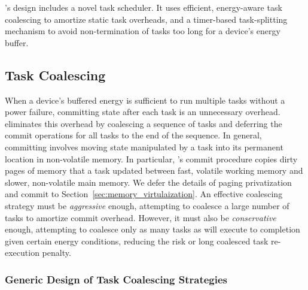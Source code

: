 \sys's design includes a novel task scheduler. It uses efficient, energy-aware task coalescing to amortize static task overheads, and a timer-based task-splitting mechanism to avoid non-termination of tasks too long for a device's energy buffer. 

\subsection{Task Coalescing}
\label{sec:task_coalescing}

When a device's buffered energy is sufficient to run multiple tasks without a power failure, committing state after each task is an unnecessary overhead. \sys eliminates this overhead by coalescing a sequence of tasks and deferring the commit
operations for all tasks to the end of the sequence. In general, committing involves moving state manipulated by a task into its permanent location in non-volatile memory. In particular, \sys's commit procedure copies dirty pages of memory that a task updated between fast, volatile working memory and slower, non-volatile main memory. We defer the details of paging privatization and commit to Section~\ref{sec:memory_virtulaization}.
An effective coalescing strategy must be {\em aggressive} enough, attempting to coalesce a large number of tasks to amortize commit overhead.
However, it must also be  {\em conservative} enough, attempting to coalesce only as many tasks as will execute to completion given certain energy conditions, reducing the risk or long coalesced task re-execution penalty. 

\subsubsection{Generic Design of Task Coalescing Strategies}
\label{subsec:coalescingGeneral}



